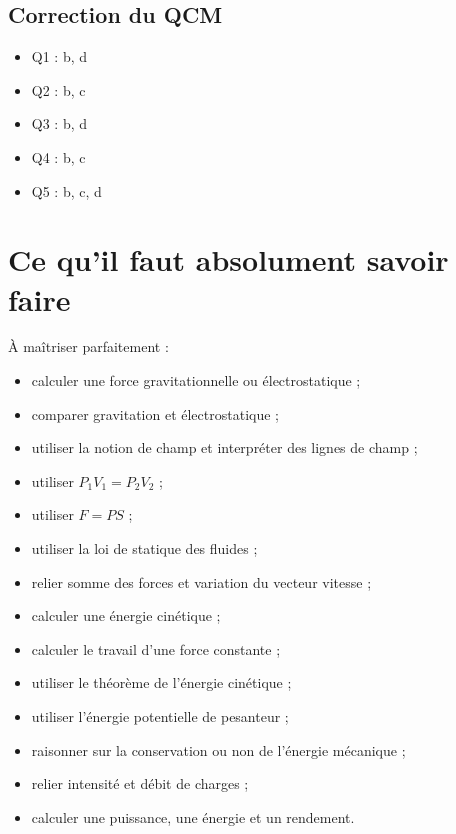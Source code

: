 \documentclass[11pt,a4paper]{article}
\begin{document}
\subsection*{Correction du QCM}

\begin{itemize}
    \item Q1 : b, d
    \item Q2 : b, c
    \item Q3 : b, d
    \item Q4 : b, c
    \item Q5 : b, c, d
\end{itemize}

\section{Ce qu'il faut absolument savoir faire}

\begin{objectifbox}
À maîtriser parfaitement :
\begin{itemize}
    \item calculer une force gravitationnelle ou électrostatique ;
    \item comparer gravitation et électrostatique ;
    \item utiliser la notion de champ et interpréter des lignes de champ ;
    \item utiliser $P_1V_1=P_2V_2$ ;
    \item utiliser $F=PS$ ;
    \item utiliser la loi de statique des fluides ;
    \item relier somme des forces et variation du vecteur vitesse ;
    \item calculer une énergie cinétique ;
    \item calculer le travail d'une force constante ;
    \item utiliser le théorème de l'énergie cinétique ;
    \item utiliser l'énergie potentielle de pesanteur ;
    \item raisonner sur la conservation ou non de l'énergie mécanique ;
    \item relier intensité et débit de charges ;
    \item calculer une puissance, une énergie et un rendement.
\end{itemize}
\end{objectifbox}
\end{document}
